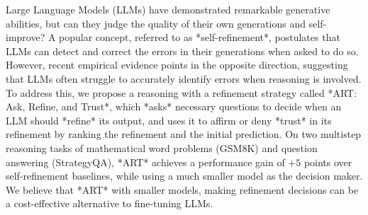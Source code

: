 Large Language Models (LLMs) have demonstrated remarkable generative abilities, but can they judge the quality of their own generations and self-improve? A popular concept, referred to as *self-refinement*, postulates that LLMs can detect and correct the errors in their generations when asked to do so. However, recent empirical evidence points in the opposite direction, suggesting that LLMs often struggle to accurately identify errors when reasoning is involved. To address this, we propose a reasoning with a refinement strategy called *ART: Ask, Refine, and Trust*, which *asks* necessary questions to decide when an LLM should *refine* its output, and uses it to affirm or deny *trust* in its refinement by ranking the refinement and the initial prediction. On two multistep reasoning tasks of mathematical word problems (GSM8K) and question answering (StrategyQA), *ART* achieves a performance gain of $+5$ points over self-refinement baselines, while using a much smaller model as the decision maker.  We believe that *ART* with smaller models, making refinement decisions can be a cost-effective alternative to fine-tuning LLMs.
